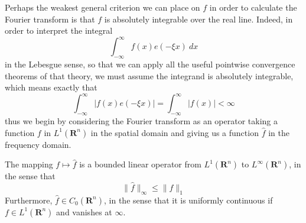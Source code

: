 Perhaps the weakest general criterion we can place on $f$ in order to calculate the Fourier transform is that $f$ is absolutely integrable over the real line. Indeed, in order to interpret the integral
%
\[ \int_{-\infty}^\infty f(x) e(- \xi x)\ dx \]
%
in the Lebesgue sense, so that we can apply all the useful pointwise convergence theorems of that theory, we must assume the integrand is absolutely integrable, which means exactly that
%
\[ \int_{-\infty}^\infty \left| f(x) e(- \xi x) \right| = \int_{-\infty}^\infty |f(x)| < \infty \]
%
thus we begin by considering the Fourier transform as an operator taking a function $f$ in $L^1(\mathbf{R}^n)$ in the spatial domain and giving us a function $\widehat{f}$ in the frequency domain.

\begin{theorem}
	The mapping $f \mapsto \widehat{f}$ is a bounded linear operator from $L^1(\mathbf{R}^n)$ to $L^\infty(\mathbf{R}^n)$, in the sense that
	\[ \| \widehat{f} \|_\infty \leq \| f \|_1 \]
	Furthermore, $\widehat{f} \in C_0(\mathbf{R}^n)$, in the sense that it is uniformly continuous if $f \in L^1(\mathbf{R}^n)$ and vanishes at $\infty$.
\end{theorem}
